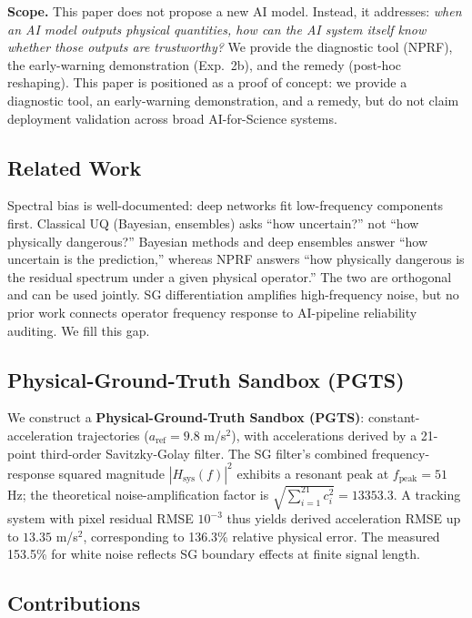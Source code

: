 \documentclass[9pt,twocolumn]{article}
\theoremstyle{remark}
\theoremstyle{definition}
\newcommand{\hsysf}{|H_{\text{sys}}(f)|^2}
\begin{document}
\textbf{Scope.} This paper does not propose a new AI model. Instead, it addresses: \textit{when an AI model outputs physical quantities, how can the AI system itself know whether those outputs are trustworthy?} We provide the diagnostic tool (NPRF), the early-warning demonstration (Exp.\ 2b), and the remedy (post-hoc reshaping). This paper is positioned as a proof of concept: we provide a diagnostic tool, an early-warning demonstration, and a remedy, but do not claim deployment validation across broad AI-for-Science systems.

\subsection{Related Work}

Spectral bias is well-documented: deep networks fit low-frequency components first\cite{rahaman2019,xu2019,tancik2020,ronen2019}. Classical UQ (Bayesian\cite{kendall2017}, ensembles\cite{lakshminarayanan2017}) asks ``how uncertain?'' not ``how physically dangerous?'' Bayesian methods and deep ensembles answer ``how uncertain is the prediction,'' whereas NPRF answers ``how physically dangerous is the residual spectrum under a given physical operator.'' The two are orthogonal and can be used jointly. SG differentiation\cite{savitzky1964} amplifies high-frequency noise, but no prior work connects operator frequency response to AI-pipeline reliability auditing. We fill this gap.

\subsection{Physical-Ground-Truth Sandbox (PGTS)}

We construct a \textbf{Physical-Ground-Truth Sandbox (PGTS)}: constant-acceleration trajectories ($a_{\text{ref}}=9.8$ m/s$^2$), with accelerations derived by a 21-point third-order Savitzky-Golay filter\cite{savitzky1964}. The SG filter's combined frequency-response squared magnitude $\hsysf$ exhibits a resonant peak at $f_{\text{peak}}=51$ Hz; the theoretical noise-amplification factor is $\sqrt{\sum_{i=1}^{21} c_i^2}=13353.3$. A tracking system with pixel residual RMSE $10^{-3}$ thus yields derived acceleration RMSE up to $13.35$ m/s$^2$, corresponding to 136.3\% relative physical error. The measured 153.5\% for white noise reflects SG boundary effects at finite signal length.

\subsection{Contributions}
\end{document}
